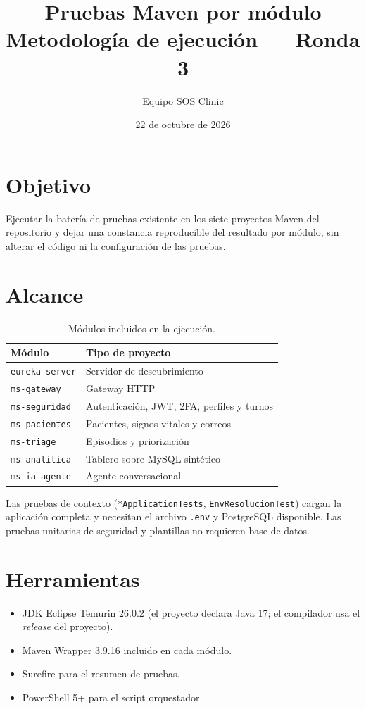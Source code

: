 \documentclass[11pt]{article}
\title{\textbf{Pruebas Maven por módulo}\\[0.3em]
\large Metodología de ejecución --- Ronda 3}
\author{Equipo SOS Clinic}
\date{22 de octubre de 2026}
\begin{document}
\maketitle

\section{Objetivo}

Ejecutar la batería de pruebas existente en los siete proyectos Maven del
repositorio y dejar una constancia reproducible del resultado por módulo, sin
alterar el código ni la configuración de las pruebas.

\section{Alcance}

\begin{table}[h]
\centering
\small
\begin{tabular}{@{}ll@{}}
\toprule
Módulo & Tipo de proyecto \\
\midrule
\texttt{eureka-server} & Servidor de descubrimiento \\
\texttt{ms-gateway} & Gateway HTTP \\
\texttt{ms-seguridad} & Autenticación, JWT, 2FA, perfiles y turnos \\
\texttt{ms-pacientes} & Pacientes, signos vitales y correos \\
\texttt{ms-triage} & Episodios y priorización \\
\texttt{ms-analitica} & Tablero sobre MySQL sintético \\
\texttt{ms-ia-agente} & Agente conversacional \\
\bottomrule
\end{tabular}
\caption{Módulos incluidos en la ejecución.}
\end{table}

Las pruebas de contexto (\texttt{*ApplicationTests}, \texttt{EnvResolucionTest})
cargan la aplicación completa y necesitan el archivo \texttt{.env} y
PostgreSQL disponible. Las pruebas unitarias de seguridad y plantillas no
requieren base de datos.

\section{Herramientas}

\begin{itemize}
  \item JDK Eclipse Temurin 26.0.2 (el proyecto declara Java 17; el compilador
  usa el \textit{release} del proyecto).
  \item Maven Wrapper 3.9.16 incluido en cada módulo.
  \item Surefire para el resumen de pruebas.
  \item PowerShell 5+ para el script orquestador.
\end{itemize}
\end{document}
